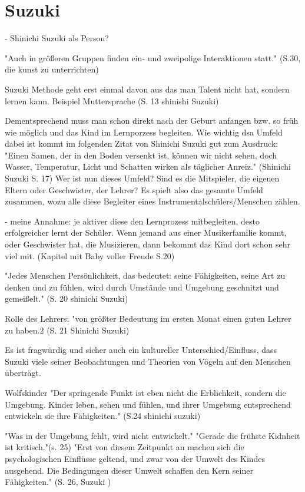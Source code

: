 \section{Suzuki}

- Shinichi Suzuki als Person?

"Auch in größeren Gruppen finden ein- und zweipolige Interaktionen statt."
(S.30, die kunst zu unterrichten)

Suzuki Methode geht erst einmal davon aus das man Talent nicht hat, sondern
lernen kann. Beispiel Muttersprache (S. 13 shinishi Suzuki)

Dementsprechend muss man schon direkt nach der Geburt anfangen bzw. so früh wie
möglich und das Kind im Lernporzess begleiten. Wie wichtig dsa Umfeld dabei ist
kommt im folgenden Zitat von Shinichi Suzuki gut zum Ausdruck: "Einen Samen, der
in den Boden versenkt ist, können wir nicht sehen, doch Wasser, Temperatur,
Licht und Schatten wirken als täglicher Anreiz." (Shinichi Suzuki S. 17)
Wer ist nun dieses Umfeld? Sind es die Mitspieler, die eigenen Eltern oder
Geschwister, der Lehrer? Es spielt also das gesamte Umfeld zusammen, wozu alle
diese Begleiter eines Instrumentalschülers/Menschen zählen. 

- meine Annahme: je aktiver diese den Lernprozess mitbegleiten, desto
erfolgreicher lernt der Schüler. Wenn jemand aus einer Musikerfamilie kommt,
oder Geschwister hat, die Musizieren, dann bekommt das Kind dort schon sehr viel
mit. (Kapitel mit Baby voller Freude S.20)

"Jedes Menschen Persönlichkeit, das bedeutet: seine Fähigkeiten, seine Art zu
denken und zu fühlen, wird durch Umstände und Umgebung geschnitzt und
gemeißelt." (S. 20 shinichi Suzuki)

Rolle des Lehrers: "von größter Bedeutung im ersten Monat einen guten Lehrer zu
haben.2 (S. 21 Shinichi Suzuki)

Es ist fragwürdig und sicher auch ein kultureller Unterschied/Einfluss, dass Suzuki viele seiner Beobachtungen und Theorien von
Vögeln auf den Menschen überträgt. 

Wolfskinder
"Der springende Punkt ist eben nicht die Erblichkeit, sondern die Umgebung.
Kinder leben, sehen und fühlen, und ihrer Umgebung entsprechend entwickeln sie
ihre Fähigkeiten." (S.24 shinichi suzuki)

"Was in der Umgebung fehlt, wird nicht entwickelt." 
"Gerade die frühste Kidnheit ist kritisch."(s. 25)
"Erst von diesem Zeitpunkt an machen sich die psychologischen Einflüsse geltend,
und zwar von der Umwelt des Kindes ausgehend. Die Bedingungen dieser Umwelt
schaffen den Kern seiner Fähigkeiten." (S. 26, Suzuki )

